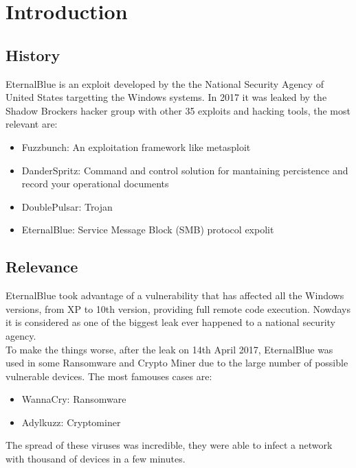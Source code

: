 \section{Introduction}
\subsection{History}
EternalBlue is an exploit developed by the the National Security Agency of United States targetting the Windows systems.
In 2017 it was leaked by the Shadow Brockers hacker group with other 35 exploits and hacking
tools, the most relevant are:
\begin{itemize}
    \item Fuzzbunch: An exploitation framework like metasploit
    \item DanderSpritz: Command and control solution for mantaining percistence and
    record your operational documents
    \item DoublePulsar: Trojan
    \item EternalBlue: Service Message Block (SMB) protocol expolit
\end{itemize}

\subsection{Relevance}
EternalBlue took advantage of a vulnerability that has affected all the Windows versions, from XP to 10th version, providing full remote code execution.
Nowdays it is considered as one of the biggest leak ever happened to a national security agency.\\
To make the things worse, after the leak on 14th April 2017, EternalBlue was used in some Ransomware and Crypto Miner due to the large number of possible vulnerable devices.
The most famouses cases are:
\begin{itemize}
    \item WannaCry: Ransomware
    \item Adylkuzz: Cryptominer
\end{itemize}
The spread of these viruses was incredible, they were able to infect a network with thousand of devices in a few minutes.